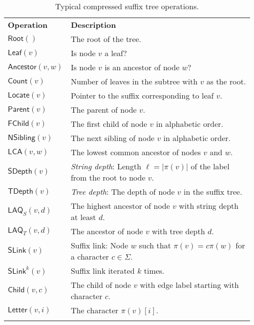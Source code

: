 \documentclass[a4paper,11pt]{llncs}
\newcommand{\abs}[1]{\ensuremath{\lvert #1 \rvert}}
\newcommand{\mRoot}{\ensuremath{\mathsf{Root}}}
\newcommand{\mLeaf}{\ensuremath{\mathsf{Leaf}}}
\newcommand{\mAncestor}{\ensuremath{\mathsf{Ancestor}}}
\newcommand{\mCount}{\ensuremath{\mathsf{Count}}}
\newcommand{\mLocate}{\ensuremath{\mathsf{Locate}}}
\newcommand{\mParent}{\ensuremath{\mathsf{Parent}}}
\newcommand{\mFChild}{\ensuremath{\mathsf{FChild}}}
\newcommand{\mNSibling}{\ensuremath{\mathsf{NSibling}}}
\newcommand{\mLCA}{\ensuremath{\mathsf{LCA}}}
\newcommand{\mSDepth}{\ensuremath{\mathsf{SDepth}}}
\newcommand{\mTDepth}{\ensuremath{\mathsf{TDepth}}}
\newcommand{\mLAQ}{\ensuremath{\mathsf{LAQ}}}
\newcommand{\mSLink}{\ensuremath{\mathsf{SLink}}}
\newcommand{\mChild}{\ensuremath{\mathsf{Child}}}
\newcommand{\mLetter}{\ensuremath{\mathsf{Letter}}}
\begin{document}
\begin{table}
\centering{}
\caption{Typical compressed suffix tree operations.}\label{table:cst
operations}

\begin{tabular}{ll}
\hline
\noalign{\smallskip}
\textbf{Operation}  & \textbf{Description} \\
\noalign{\smallskip}
\hline
\noalign{\smallskip}
$\mRoot()$          & The root of the tree. \\
$\mLeaf(v)$         & Is node $v$ a leaf? \\
$\mAncestor(v,w)$   & Is node $v$ is an ancestor of node $w$? \\
\noalign{\smallskip}
$\mCount(v)$        & Number of leaves in the subtree with $v$ as the root. \\
$\mLocate(v)$       & Pointer to the suffix corresponding to leaf $v$. \\
\noalign{\smallskip}
$\mParent(v)$       & The parent of node $v$. \\
$\mFChild(v)$       & The first child of node $v$ in alphabetic order. \\
$\mNSibling(v)$     & The next sibling of node $v$ in alphabetic order. \\
$\mLCA(v,w)$        & The lowest common ancestor of nodes $v$ and $w$. \\
\noalign{\smallskip}
$\mSDepth(v)$       & \emph{String depth}: Length $\ell = \abs{\pi(v)}$ of the
label from the root to node $v$. \\
$\mTDepth(v)$       & \emph{Tree depth}: The depth of node $v$ in the suffix
tree. \\
$\mLAQ_{S}(v,d)$    & The highest ancestor of node $v$ with string depth at
least $d$. \\
$\mLAQ_{T}(v,d)$    & The ancestor of node $v$ with tree depth $d$. \\
\noalign{\smallskip}
$\mSLink(v)$        & Suffix link: Node $w$ such that $\pi(v) = c \pi(w)$ for
a character $c \in \Sigma$. \\
$\mSLink^{k}(v)$    & Suffix link iterated $k$ times. \\
\noalign{\smallskip}
$\mChild(v,c)$      & The child of node $v$ with edge label starting with
character $c$. \\
$\mLetter(v,i)$     & The character $\pi(v)[i]$. \\
\noalign{\smallskip}
\hline
\end{tabular}
\end{table}
\end{document}
